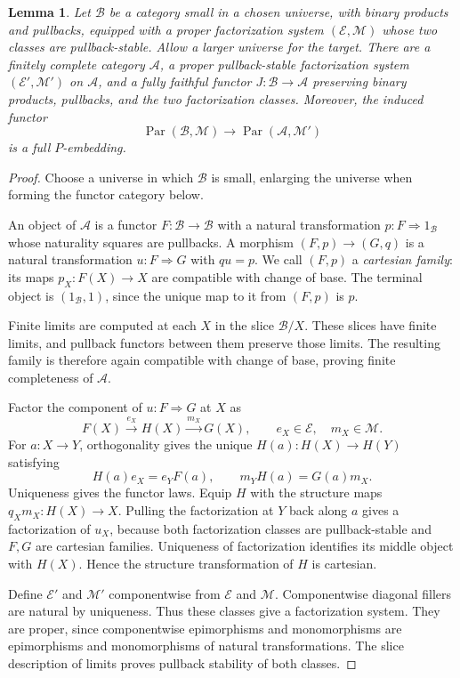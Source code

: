 \documentclass[11pt]{article}
\newtheorem{lemma}[theorem]{Lemma}
\begin{document}
\begin{lemma}\label{lem:terminal-completion}
Let $\mathcal B$ be a category small in a chosen universe, with binary products and pullbacks, equipped with a proper factorization system $(\mathcal E,\mathcal M)$ whose two classes are pullback-stable. Allow a larger universe for the target. There are a finitely complete category $\mathcal A$, a proper pullback-stable factorization system $(\mathcal E',\mathcal M')$ on $\mathcal A$, and a fully faithful functor $J:\mathcal B\to\mathcal A$ preserving binary products, pullbacks, and the two factorization classes. Moreover, the induced functor
\[
\operatorname{Par}(\mathcal B,\mathcal M)
 \longrightarrow\operatorname{Par}(\mathcal A,\mathcal M')
\]
is a full $P$-embedding.
\end{lemma}
\begin{proof}
Choose a universe in which $\mathcal B$ is small, enlarging the universe when forming the functor category below.

An object of $\mathcal A$ is a functor $F:\mathcal B\to\mathcal B$ with a natural transformation $p:F\Rightarrow1_{\mathcal B}$ whose naturality squares are pullbacks. A morphism $(F,p)\to(G,q)$ is a natural transformation $u:F\Rightarrow G$ with $qu=p$. We call $(F,p)$ a \emph{cartesian family}: its maps $p_X:F(X)\to X$ are compatible with change of base. The terminal object is $(1_{\mathcal B},1)$, since the unique map to it from $(F,p)$ is $p$.

Finite limits are computed at each $X$ in the slice $\mathcal B/X$. These slices have finite limits, and pullback functors between them preserve those limits. The resulting family is therefore again compatible with change of base, proving finite completeness of $\mathcal A$.

Factor the component of $u:F\Rightarrow G$ at $X$ as
\[
F(X)\xrightarrow{e_X}H(X)\xrightarrow{m_X}G(X),
\qquad e_X\in\mathcal E,\quad m_X\in\mathcal M.
\]
For $a:X\to Y$, orthogonality gives the unique $H(a):H(X)\to H(Y)$ satisfying
\[
H(a)e_X=e_YF(a),\qquad m_YH(a)=G(a)m_X.
\]
Uniqueness gives the functor laws. Equip $H$ with the structure maps $q_Xm_X:H(X)\to X$. Pulling the factorization at $Y$ back along $a$ gives a factorization of $u_X$, because both factorization classes are pullback-stable and $F,G$ are cartesian families. Uniqueness of factorization identifies its middle object with $H(X)$. Hence the structure transformation of $H$ is cartesian.

Define $\mathcal E'$ and $\mathcal M'$ componentwise from $\mathcal E$ and $\mathcal M$. Componentwise diagonal fillers are natural by uniqueness. Thus these classes give a factorization system. They are proper, since componentwise epimorphisms and monomorphisms are epimorphisms and monomorphisms of natural transformations. The slice description of limits proves pullback stability of both classes.


\end{proof}
\end{document}
